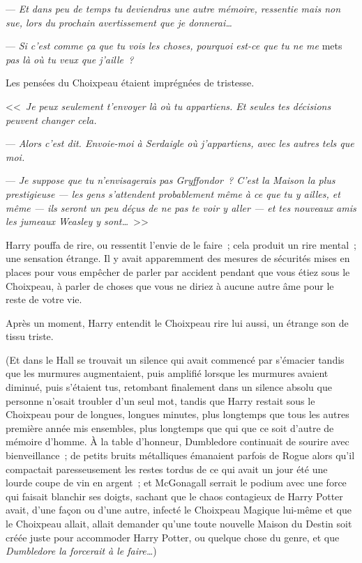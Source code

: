 --- \emph{Et dans peu de temps tu deviendras une autre mémoire, ressentie mais non sue, lors du prochain avertissement que je donnerai…}

--- \emph{Si c'est comme ça que tu vois les choses, pourquoi est-ce que tu ne me} mets \emph{pas là où tu veux que j'aille~?}

Les pensées du Choixpeau étaient imprégnées de tristesse.

<<~\emph{Je peux seulement t'envoyer là où tu appartiens. Et seules tes décisions peuvent changer cela.}

--- \emph{Alors c'est dit. Envoie-moi à Serdaigle où j'appartiens, avec les autres tels que moi.}

--- \emph{Je suppose que tu n'envisagerais pas Gryffondor~? C'est la Maison la plus prestigieuse — les gens s'attendent probablement même à ce que tu y ailles, et même — ils seront un peu déçus de ne pas te voir y aller — et tes nouveaux amis les jumeaux Weasley y sont…}~>>

Harry pouffa de rire, ou ressentit l'envie de le faire~; cela produit un rire mental~; une sensation étrange. Il y avait apparemment des mesures de sécurités mises en places pour vous empêcher de parler par accident pendant que vous étiez sous le Choixpeau, à parler de choses que vous ne diriez à aucune autre âme pour le reste de votre vie.

Après un moment, Harry entendit le Choixpeau rire lui aussi, un étrange son de tissu triste.

(Et dans le Hall se trouvait un silence qui avait commencé par s'émacier tandis que les murmures augmentaient, puis amplifié lorsque les murmures avaient diminué, puis s'étaient tus, retombant finalement dans un silence absolu que personne n'osait troubler d'un seul mot, tandis que Harry restait sous le Choixpeau pour de longues, longues minutes, plus longtemps que tous les autres première année mis ensembles, plus longtemps que qui que ce soit d'autre de mémoire d'homme. À la table d'honneur, Dumbledore continuait de sourire avec bienveillance~; de petits bruits métalliques émanaient parfois de Rogue alors qu'il compactait paresseusement les restes tordus de ce qui avait un jour été une lourde coupe de vin en argent~; et McGonagall serrait le podium avec une force qui faisait blanchir ses doigts, sachant que le chaos contagieux de Harry Potter avait, d'une façon ou d'une autre, infecté le Choixpeau Magique lui-même et que le Choixpeau allait, allait demander qu'une toute nouvelle Maison du Destin soit créée juste pour accommoder Harry Potter, ou quelque chose du genre, et que \emph{Dumbledore la forcerait à le faire…})

